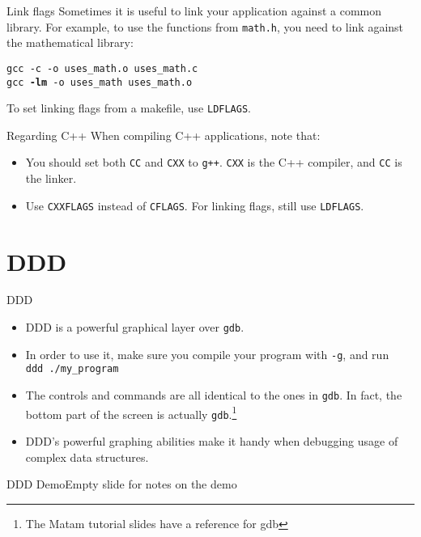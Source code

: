\documentclass{beamer}
\begin{document}
\begin{frame}{Link flags}
  Sometimes it is useful to link your application against a common library.
  For example, to use the functions from \texttt{math.h}, you need to link
  against the mathematical library:

  \texttt{gcc -c -o uses\_math.o uses\_math.c\\
  gcc \textbf{-lm} -o uses\_math uses\_math.o}

  To set linking flags from a makefile, use \texttt{LDFLAGS}.
\end{frame}

\begin{frame}{Regarding C++}
  When compiling C++ applications, note that:
  \begin{itemize}
    \item You should set both \texttt{CC} and \texttt{CXX} to \texttt{g++}.
      \texttt{CXX} is the C++ compiler, and \texttt{CC} is the linker.
    \item Use \texttt{CXXFLAGS} instead of \texttt{CFLAGS}. For linking
      flags, still use \texttt{LDFLAGS}.
  \end{itemize}
\end{frame}



\section{DDD}

\begin{frame}{DDD}
  \begin{itemize}
    \item DDD is a powerful graphical layer over \texttt{gdb}.
    \item In order to use it, make sure you compile your program with
      \texttt{-g}, and run \\
      \texttt{ddd ./my\_program}
    \item The controls and commands are all identical to the ones in
      \texttt{gdb}. In fact, the bottom part of the screen is actually
      \texttt{gdb}.\footnote{The Matam tutorial slides have a reference
      for gdb}
    \item DDD's powerful graphing abilities make it handy when debugging
      usage of complex data structures.
  \end{itemize}
\end{frame}

 {
\begin{frame}{DDD Demo}{Empty slide for notes on the demo}
\end{frame}
}
\end{document}
